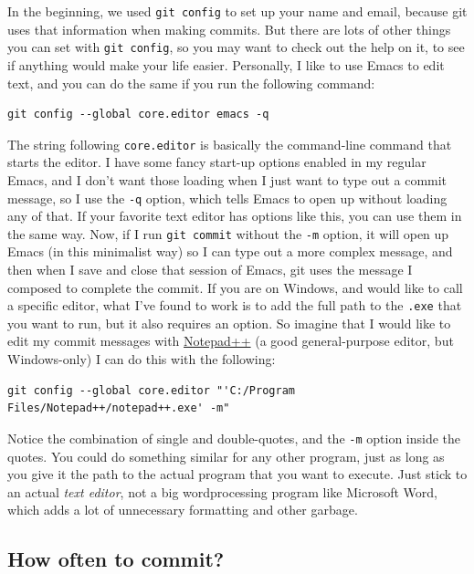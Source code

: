 \documentclass{article}
\begin{document}
In the beginning, we used \texttt{git config} to set up your name and email, because git uses that information when making commits. But there are lots of other things you can set with \texttt{git config}, so you may want to check out the help on it, to see if anything would make your life easier.  Personally, I like to use Emacs to edit text, and you can do the same if you run the following command:


\begin{verbatim}
git config --global core.editor emacs -q
\end{verbatim}

The string following \texttt{core.editor} is basically the command-line command that starts the editor. I have some fancy start-up options enabled in my regular Emacs, and I don't want those loading when I just want to type out a commit message, so I use the \texttt{-q} option, which tells Emacs to open up without loading any of that.  If your favorite text editor has options like this, you can use them in the same way.  Now, if I run \texttt{git commit} without the \texttt{-m} option, it will open up Emacs (in this minimalist way) so I can type out a more complex message, and then when I save and close that session of Emacs, git uses the message I composed to complete the commit.  If you are on Windows, and would like to call a specific editor, what I've found to work is to add the full path to the \texttt{.exe} that you want to run, but it also requires an option.  So imagine that I would like to edit my commit messages with \href{http://notepad-plus-plus.org/}{Notepad++} (a good general-purpose editor, but Windows-only) I can do this with the following:


\begin{verbatim}
git config --global core.editor "'C:/Program Files/Notepad++/notepad++.exe' -m"
\end{verbatim}

Notice the combination of single and double-quotes, and the \texttt{-m} option inside the quotes.  You could do something similar for any other program, just as long as you give it the path to the actual program that you want to execute.  Just stick to an actual \emph{text editor}, not a big wordprocessing program like Microsoft Word, which adds a lot of unnecessary formatting and other garbage.
\subsection{How often to commit?}
\label{sec-5-8}
\end{document}
